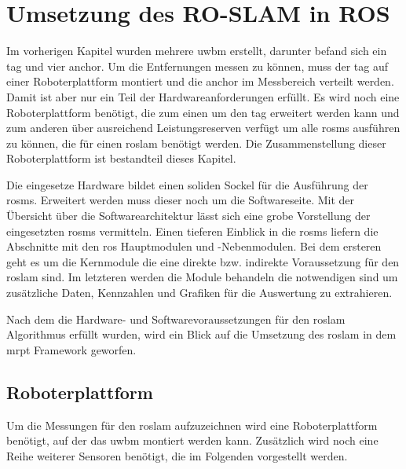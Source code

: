 %
%
%
\chapter{Umsetzung des RO-SLAM in ROS}
\label{ch:ro_slam}

Im vorherigen Kapitel wurden mehrere \gls{uwbm} erstellt, darunter befand sich ein \gls{tag} und vier \gls{anchor}. Um die Entfernungen messen zu können, muss der \gls{tag} auf einer Roboterplattform montiert und die \gls{anchor} im Messbereich verteilt werden. Damit ist aber nur ein Teil der Hardwareanforderungen erfüllt. Es wird noch eine Roboterplattform benötigt, die zum einen um den \gls{tag} erweitert werden kann und zum anderen über ausreichend Leistungsreserven verfügt um alle \glspl{rosm} ausführen zu können, die für einen \gls{roslam} benötigt werden. Die Zusammenstellung dieser Roboterplattform ist bestandteil dieses Kapitel.

Die eingesetze Hardware bildet einen soliden Sockel für die Ausführung der \glspl{rosm}. Erweitert werden muss dieser noch um die Softwareseite. Mit der Übersicht über die Softwarearchitektur lässt sich eine grobe Vorstellung der eingesetzten \glspl{rosm} vermitteln. Einen tieferen Einblick in die \glspl{rosm} liefern die Abschnitte mit den \gls{ros} Hauptmodulen und -Nebenmodulen. Bei dem ersteren geht es um die Kernmodule die eine direkte bzw. indirekte Voraussetzung für den \gls{roslam} sind. Im letzteren werden die Module behandeln die notwendigen sind um zusätzliche Daten, Kennzahlen und Grafiken für die Auswertung zu extrahieren.

Nach dem die Hardware- und Softwarevoraussetzungen für den \gls{roslam} Algorithmus erfüllt wurden, wird ein Blick auf die Umsetzung des \gls{roslam} in dem \gls{mrpt} Framework geworfen.


%
%
\section{Roboterplattform}

Um die Messungen für den \Gls{roslam} aufzuzeichnen wird eine Roboterplattform benötigt, auf der das \Gls{uwbm} montiert werden kann. Zusätzlich wird noch eine Reihe weiterer Sensoren benötigt, die im Folgenden vorgestellt werden.

